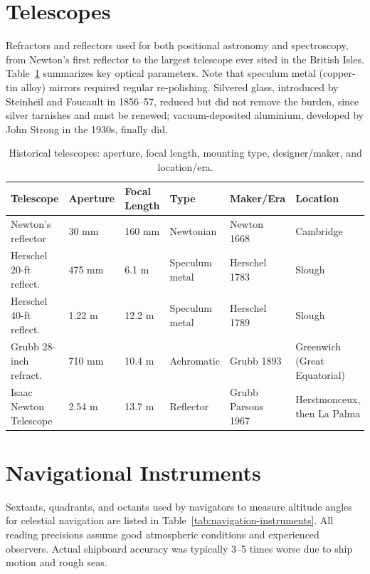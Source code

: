 \section{Telescopes}

Refractors and reflectors used for both positional astronomy and spectroscopy, from Newton's first reflector to the largest telescope ever sited in the British Isles. Table~\ref{tab:telescopes} summarizes key optical parameters. Note that speculum metal (copper-tin alloy) mirrors required regular re-polishing. Silvered glass, introduced by Steinheil and Foucault in 1856--57, reduced but did not remove the burden, since silver tarnishes and must be renewed; vacuum-deposited aluminium, developed by John Strong in the 1930s, finally did.

\begin{table}
  \centering
  \caption{Historical telescopes: aperture, focal length, mounting type, designer/maker, and location/era.}
  \label{tab:telescopes}
  \begin{tabularx}{\linewidth}{lllllX}
    \toprule
    \textbf{Telescope} & \textbf{Aperture} & \textbf{Focal Length} & \textbf{Type} & \textbf{Maker/Era} & \textbf{Location} \\
    \midrule
    Newton's reflector & 30 mm & 160 mm & Newtonian & Newton 1668 & Cambridge \\
    Herschel 20-ft reflect. & 475 mm & 6.1 m & Speculum metal & Herschel 1783 & Slough \\
    Herschel 40-ft reflect. & 1.22 m & 12.2 m & Speculum metal & Herschel 1789 & Slough \\
    Grubb 28-inch refract. & 710 mm & 10.4 m & Achromatic & Grubb 1893 & Greenwich (Great Equatorial) \\
    Isaac Newton Telescope & 2.54 m & 13.7 m & Reflector & Grubb Parsons 1967 & Herstmonceux, then La Palma \\
    \bottomrule
  \end{tabularx}
\end{table}

\section{Navigational Instruments}

Sextants, quadrants, and octants used by navigators to measure altitude angles for celestial navigation are listed in Table~\ref{tab:navigation-instruments}. All reading precisions assume good atmospheric conditions and experienced observers. Actual shipboard accuracy was typically 3–5 times worse due to ship motion and rough seas.

